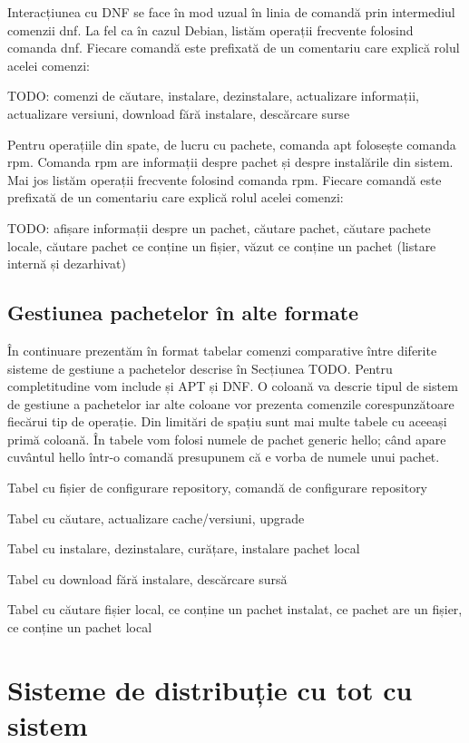 Interacțiunea cu DNF se face în mod uzual în linia de comandă prin intermediul comenzii dnf. La fel ca în cazul Debian, listăm operații frecvente folosind comanda dnf. Fiecare comandă este prefixată de un comentariu care explică rolul acelei comenzi:

TODO: comenzi de căutare, instalare, dezinstalare, actualizare informații, actualizare versiuni, download fără instalare, descărcare surse

Pentru operațiile din spate, de lucru cu pachete, comanda apt folosește comanda rpm. Comanda rpm are informații despre pachet și despre instalările din sistem. Mai jos listăm operații frecvente folosind comanda rpm. Fiecare comandă este prefixată de un comentariu care explică rolul acelei comenzi:

TODO: afișare informații despre un pachet, căutare pachet, căutare pachete locale, căutare pachet ce conține un fișier, văzut ce conține un pachet (listare internă și dezarhivat)

\subsection{Gestiunea pachetelor în alte formate}
\label{sec:package:other}

În continuare prezentăm în format tabelar comenzi comparative între diferite sisteme de gestiune a pachetelor descrise în Secțiunea TODO. Pentru completitudine vom include și APT și DNF. O coloană va descrie tipul de sistem de gestiune a pachetelor iar alte coloane vor prezenta comenzile corespunzătoare fiecărui tip de operație. Din limitări de spațiu sunt mai multe tabele cu aceeași primă coloană. În tabele vom folosi numele de pachet generic hello; când apare cuvântul hello într-o comandă presupunem că e vorba de numele unui pachet.

Tabel cu fișier de configurare repository, comandă de configurare repository

Tabel cu căutare, actualizare cache/versiuni, upgrade

Tabel cu instalare, dezinstalare, curățare, instalare pachet local

Tabel cu download fără instalare, descărcare sursă

Tabel cu căutare fișier local, ce conține un pachet instalat, ce pachet are un fișier, ce conține un pachet local

\section{Sisteme de distribuție cu tot cu sistem}
\label{sec:package:all-in-one}

